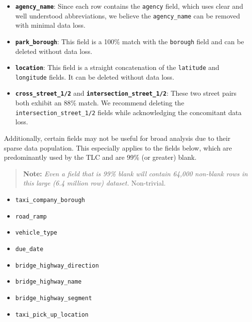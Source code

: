 \documentclass[linenumber]{jdsart}
\begin{document}
\begin{itemize}[left=1.5em]
    \item \textbf{\texttt{agency\_name}}: Since each row contains the \texttt{agency} 
    field, which uses clear and well understood abbreviations, we believe the
    \texttt{agency\_name} can be removed with minimal data loss.
    
    \item \textbf{\texttt{park\_borough}}: This field is a 100\% match with 
    the \texttt{borough} field and can be deleted without data loss.
    
    \item \textbf{\texttt{location}}: This field is a straight concatenation of 
    the \texttt{latitude} and \texttt{longitude} fields. It can be 
    deleted without data loss.
     
    \item \textbf{\texttt{cross\_street\_1/2}} and \textbf{\texttt{intersection\_street\_1/2}}: 
    These two street pairs both exhibit an 88\% match. We recommend deleting the 
    \texttt{intersection\_street\_1/2} fields while acknowledging 
    the concomitant data loss.
\end{itemize}

Additionally, certain fields may not be useful for broad analysis
due to their sparse data population. This especially applies to the fields below, 
which are predominantly used by the TLC and are 99\% (or greater) blank.

\begin{quote}
\textbf{Note:} \textit{Even a field that is 99\% blank will contain 64,000 
non\mbox{-}blank rows in this large (6.4 million row) 
dataset.} Non\mbox{-}trivial.
\end{quote}

\begin{itemize}[left=1.5em]
    \item \texttt{taxi\_company\_borough}
    \item \texttt{road\_ramp}
    \item \texttt{vehicle\_type}
    \item \texttt{due\_date}
    \item \texttt{bridge\_highway\_direction}
    \item \texttt{bridge\_highway\_name}
    \item \texttt{bridge\_highway\_segment}
    \item \texttt{taxi\_pick\_up\_location}
\end{itemize}
\end{document}

